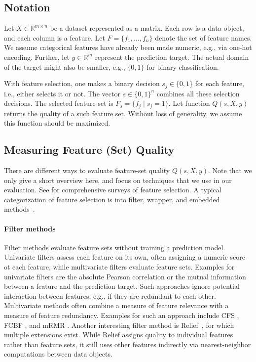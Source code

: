 \documentclass{article}
\theoremstyle{definition}
\begin{document}
\subsection{Notation}
\label{sec:fundamentals:notation}

Let $X \in \mathbb{R}^{m \times n}$ be a dataset represented as a matrix.
Each row is a data object, and each column is a feature.
Let $F = \{f_1, \dots, f_n\}$ denote the set of feature names.
We assume categorical features have already been made numeric, e.g., via one-hot encoding.
Further, let $y \in \mathbb{R}^m$ represent the prediction target.
The actual domain of the target might also be smaller, e.g., $\{0,1\}$ for binary classification.

With feature selection, one makes a binary decision $s_j \in \{0,1\}$ for each feature, i.e., either selects it or not.
The vector $s \in \{0,1\}^n$ combines all these selection decisions.
The selected feature set is $F_s = \{f_j \mid s_j=1\}$.
Let function $Q(s,X,y)$ returns the quality of a such feature set.
Without loss of generality, we assume this function should be maximized.

\subsection{Measuring Feature (Set) Quality}
\label{sec:fundamentals:quality}

There are different ways to evaluate feature-set quality $Q(s,X,y)$.
Note that we only give a short overview here, and focus on techniques that we use in our evaluation.
See \cite{chandrashekar2014survey,li2017feature} for comprehensive surveys of feature selection.
A typical categorization of feature selection is into filter, wrapper, and embedded methods~\cite{guyon2003introduction}.

\paragraph{Filter methods}

Filter methods evaluate feature sets without training a prediction model.
Univariate filters assess each feature on its own, often assigning a numeric score ot each feature, while multivariate filters evaluate feature sets.
Examples for univariate filters are the absolute Pearson correlation or the mutual information between a feature and the prediction target.
Such approaches ignore potential interaction between features, e.g., if they are redundant to each other.
Multivariate methods often combine a measure of feature relevance with a measure of feature redundancy.
Examples for such an approach include CFS \cite{hall1999correlation}, FCBF \cite{yu2003feature}, and mRMR \cite{peng2005feature}.
Another interesting filter method is Relief~\cite{kira1992feature}, for which multiple extensions exist.
While Relief assigns quality to individual features rather than feature sets, it still uses other features indirectly via nearest-neighbor computations between data objects.
\end{document}
